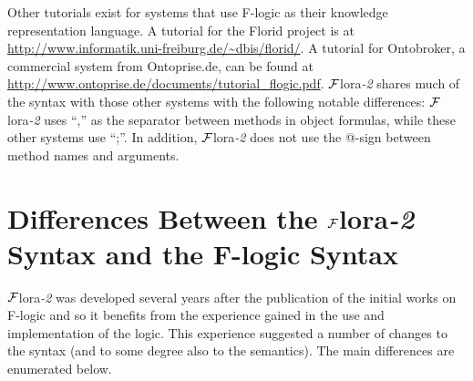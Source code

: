 \documentclass[11pt]{article}
\newcommand{\FLORA}{{\mbox{\sc ${\cal F}${lora}\rm\emph{-2}}}\xspace}
\newcommand{\FLORID}{{\mbox{\sc Florid}}\xspace}
\begin{document}
Other tutorials exist for systems that use F-logic as their knowledge
representation language. A tutorial for the \FLORID project is at
\url{http://www.informatik.uni-freiburg.de/~dbis/florid/}. A tutorial
for Ontobroker, a commercial system from Ontoprise.de, can be found at\\
\url{http://www.ontoprise.de/documents/tutorial_flogic.pdf}.  \FLORA shares
much of the syntax with those other systems with the following notable
differences: \FLORA uses ``,'' as the separator between methods in object
formulas, while these other systems use ``;''. In addition, \FLORA does not
use the @-sign between method names and arguments.


\section{Differences Between the \FLORA Syntax and the F-logic Syntax}

\FLORA was developed several years after the publication of the initial
works on F-logic \cite{KLW95} and so it benefits from the experience gained
in the use and implementation of the logic. This experience suggested a
number of changes to the syntax (and to some degree also to the
semantics). The main differences are enumerated below.
\end{document}
